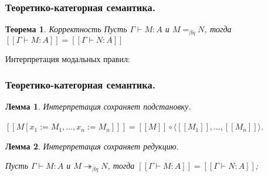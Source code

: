 \documentclass[10pt,pdf,utf8,russian,aspectratio=169]{beamer}
\newtheorem{theor}{Теорема}
\newtheorem{lem}{Лемма}
\begin{document}
\begin{frame}
  \frametitle{Теоретико-категорная семантика.}

  \begin{theor} Корректность
Пусть $\Gamma \vdash M : A$ и $M =_{\beta\eta} N$, тогда $[\![\Gamma \vdash M : A]\!] = [\![\Gamma \vdash N : A]\!]$
  \end{theor}

  Интерпретация модальных правил:

  \begin{prooftree}
  \end{prooftree}

\begin{small}
  \begin{prooftree}
  \end{prooftree}
\end{small}
\end{frame}

\begin{frame}
  \frametitle{Теоретико-категорная семантика.}

  \begin{lem} Интерпретация сохраняет подстановку.

  $[\![M [x_1 := M_1,\dots, x_n := M_n]]\!] = [\![M]\!] \circ \langle [\![M_1]\!], \dots, [\![M_n]\!] \rangle$.
  \end{lem}

  \begin{lem} Интерпретация сохраняет редукцию.

      Пусть $\Gamma \vdash M : A$ и $M \twoheadrightarrow_{\beta \eta} N$, тогда $[\![\Gamma \vdash M : A]\!] = [\![\Gamma \vdash N : A]\!]$;
  \end{lem}
\end{frame}
\end{document}
